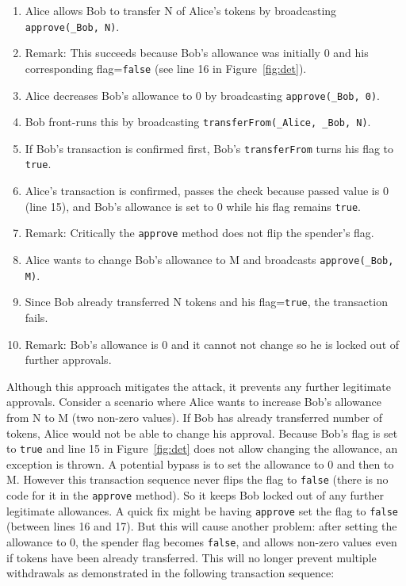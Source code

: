 \begin{enumerate}
	\item Alice allows Bob to transfer N of Alice's tokens by broadcasting \texttt{approve(\_Bob, N)}. 
	\item Remark: This succeeds because Bob’s allowance was initially 0 and his corresponding flag=\texttt{false} (see line 16 in Figure~\ref{fig:det}).
	\item Alice decreases Bob's allowance to 0 by broadcasting \texttt{approve(\_Bob, 0)}.
	\item Bob front-runs this by broadcasting \texttt{transferFrom(\_Alice, \_Bob, N)}.
	\item If Bob's transaction is confirmed first, Bob's \texttt{transferFrom} turns his flag to \texttt{true}.
	\item Alice’s transaction is confirmed, passes the check because passed value is 0 (line 15), and Bob’s allowance is set to 0 while his flag remains \texttt{true}.
	\item Remark: Critically the \texttt{approve} method does not flip the spender's flag.
	\item Alice wants to change Bob’s allowance to M and broadcasts \texttt{approve(\_Bob, M)}. 
	\item Since Bob already transferred N tokens and his flag=\texttt{true}, the transaction fails.
	\item Remark: Bob’s allowance is 0 and it cannot not change so he is locked out of further approvals.
\end{enumerate}


Although this approach mitigates the attack, it prevents any further legitimate approvals. Consider a scenario where Alice wants to increase Bob’s allowance from N to M (two non-zero values). If Bob has already transferred number of tokens, Alice would not be able to change his approval. Because Bob's flag is set to \texttt{true} and line 15 in Figure~\ref{fig:det} does not allow changing the allowance, an exception is thrown. A potential bypass is to set the allowance to 0 and then to M. However this transaction sequence never flips the flag to \texttt{false} (there is no code for it in the \texttt{approve} method). So it keeps Bob locked out of any further legitimate allowances. A quick fix might be having \texttt{approve} set the flag to \texttt{false} (\ie between lines 16 and 17). But this will cause another problem: after setting the allowance to 0, the spender flag becomes \texttt{false}, and allows non-zero values even if tokens have been already transferred. This will no longer prevent multiple withdrawals as demonstrated in the following transaction sequence:


